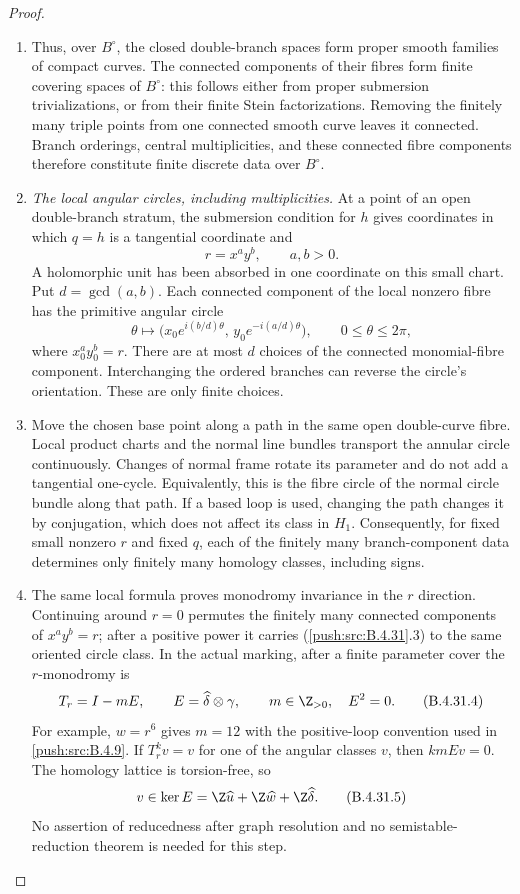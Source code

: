 \begin{proof}
\begin{enumerate}[label=\arabic*.,leftmargin=*]
\item Thus, over $B^\circ$, the closed double-branch spaces form
proper smooth families of compact curves. The connected
components of their fibres form finite covering spaces of
$B^\circ$: this follows either from proper submersion
trivializations, or from their finite Stein factorizations.
Removing the finitely many triple points from one connected
smooth curve leaves it connected. Branch orderings, central
multiplicities, and these connected fibre components therefore
constitute finite discrete data over $B^\circ$.

\item \emph{The local angular circles, including multiplicities.}
At a point of an open double-branch stratum, the submersion
condition for $h$ gives coordinates in which $q=h$ is a
tangential coordinate and
\[
                 r=x^a y^b,\qquad a,b>0.
 \tag{B.4.31.2}
\]
A holomorphic unit has been absorbed in one coordinate on this
small chart. Put $d=\gcd(a,b)$. Each connected component of the
local nonzero fibre has the primitive angular circle
\[
 \theta\longmapsto
 \bigl(x_0e^{i(b/d)\theta},\,
       y_0e^{-i(a/d)\theta}\bigr),
       \qquad 0\le\theta\le2\pi,
 \tag{B.4.31.3}
\]
where $x_0^a y_0^b=r$. There are at most $d$ choices of the
connected monomial-fibre component. Interchanging the ordered
branches can reverse the circle's orientation. These are only
finite choices.

\item Move the chosen base point along a path in the same open
double-curve fibre. Local product charts and the normal line
bundles transport the annular circle continuously. Changes of
normal frame rotate its parameter and do not add a tangential
one-cycle. Equivalently, this is the fibre circle of the normal
circle bundle along that path. If a based loop is used, changing
the path changes it by conjugation, which does not affect its
class in $H_1$. Consequently, for fixed small nonzero $r$ and
fixed $q$, each of the finitely many branch-component data
determines only finitely many homology classes, including signs.

\item The same local formula proves monodromy invariance in the
$r$ direction. Continuing around $r=0$ permutes the finitely
many connected components of $x^a y^b=r$; after a positive
power it carries (\ref{push:src:B.4.31}.3) to the same oriented circle class.
In the actual marking, after a finite parameter cover the
$r$-monodromy is
\[
 T_r=I-mE,\qquad
 E=\widehat\delta\otimes\gamma,\qquad m\in\Z_{>0},
 \quad E^2=0.
 \tag{B.4.31.4}
\]
For example, $w=r^6$ gives $m=12$ with the positive-loop
convention used in \ref{push:src:B.4.9}. If $T_r^k v=v$ for one of the
angular classes $v$, then $kmEv=0$. The homology lattice is
torsion-free, so
\[
 v\in\ker E
    =\Z\widehat u+\Z\widehat w+\Z\widehat\delta.
 \tag{B.4.31.5}
\]
No assertion of reducedness after graph resolution and no
semistable-reduction theorem is needed for this step.


\end{enumerate}
\end{proof}

